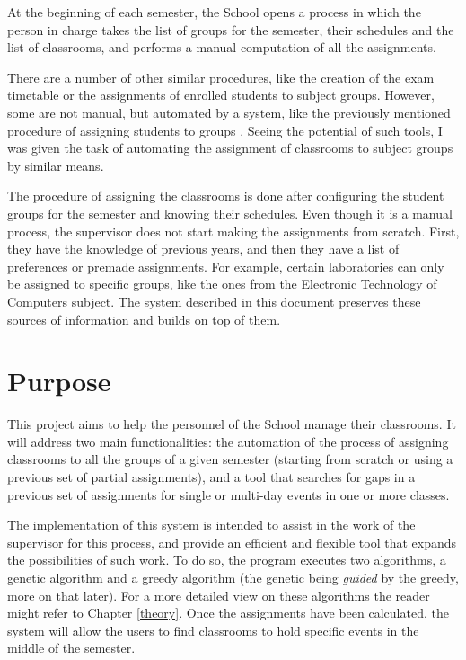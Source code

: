 At the beginning of each semester, the School opens a process in which the person in charge takes the list of groups for the semester, their schedules and the list of classrooms, and performs a manual computation of all the assignments.

There are a number of other similar procedures, like the creation of the exam timetable or the assignments of enrolled students to subject groups. However, some are not manual, but automated by a system, like the previously mentioned procedure of assigning students to groups \cite{delacruz18metaheuristics}. Seeing the potential of such tools, I was given the task of automating the assignment of classrooms to subject groups by similar means. 

The procedure of assigning the classrooms is done after configuring the student groups for the semester and knowing their schedules. Even though it is a manual process, the supervisor does not start making the assignments from scratch. First, they have the knowledge of previous years, and then they have a list of preferences or premade assignments. For example, certain laboratories can only be assigned to specific groups, like the ones from the Electronic Technology of Computers subject. The system described in this document preserves these sources of information and builds on top of them.


\section{Purpose}\label{purpose}

This project aims to help the personnel of the School manage their classrooms. It will address two main functionalities: the automation of the process of assigning classrooms to all the groups of a given semester (starting from scratch or using a previous set of partial assignments), and a tool that searches for gaps in a previous set of assignments for single or multi-day events in one or more classes.

The implementation of this system is intended to assist in the work of the supervisor for this process, and provide an efficient and flexible tool that expands the possibilities of such work. To do so, the program executes two algorithms, a genetic algorithm and a greedy algorithm (the genetic being \textit{guided} by the greedy, more on that later). For a more detailed view on these algorithms the reader might refer to Chapter \ref{theory}. Once the assignments have been calculated, the system will allow the users to find classrooms to hold specific events in the middle of the semester.

